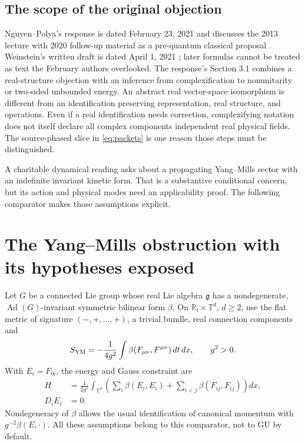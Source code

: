 \subsection{The scope of the original objection}
Nguyen--Polya's response is dated February 23, 2021 and discusses the
2013 lecture with 2020 follow-up material as a pre-quantum classical
proposal \cite[pp.~1--2]{NP}. Weinstein's written draft is dated
April 1, 2021 \cite{GU}; later formulas cannot be treated as text the
February authors overlooked. The response's Section 3.1 combines a
real-structure objection with an inference from complexification to
nonunitarity or two-sided unbounded energy.
An abstract real vector-space isomorphism is different from an
identification preserving representation, real structure, and operations.
Even if a real identification needs correction, complexifying notation
does not itself declare all complex components independent real physical
fields. The source-phased slice in \eqref{eq:packets} is one reason those
steps must be distinguished.

A charitable dynamical reading asks about a propagating Yang--Mills
sector with an indefinite invariant kinetic form. That is a substantive
conditional concern, but its action and physical modes need an
applicability proof. The following comparator makes those assumptions
explicit.

\section{The Yang--Mills obstruction with its hypotheses exposed}
\label{sec:ym}

Let $G$ be a connected Lie group whose real Lie algebra $\mathfrak g$
has a nondegenerate, $\operatorname{Ad}(G)$-invariant symmetric bilinear
form $\beta$. On
$\mathbb R_t\times\mathbb T^d$, $d\geq2$, use the flat metric of signature
$(-,+,\ldots,+)$, a trivial bundle, real connection components and
\begin{equation}
 S_{\mathrm{YM}}=-\frac1{4g^2}\int\beta(F_{\mu\nu},F^{\mu\nu})\,dt\,dx,
 \qquad g^2>0. \label{eq:ym}
\end{equation}
With $E_i=F_{0i}$, the energy and Gauss constraint are
\begin{align}
 H&=\frac1{2g^2}\int_{\mathbb T^d}
 \left(\sum_i\beta(E_i,E_i)+
 \sum_{i<j}\beta(F_{ij},F_{ij})\right)dx, \label{eq:H}\\
 D_iE_i&=0. \label{eq:Gauss}
\end{align}
Nondegeneracy of $\beta$ allows the usual identification of canonical
momentum with $g^{-2}\beta(E,\cdot)$. All these assumptions belong to this
comparator, not to GU by default.

